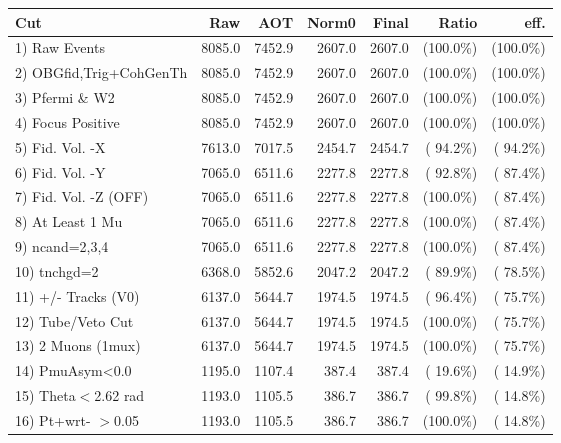  \begin{table}[h!]\centering
 \begin{tabular}{||l||r|r|r|r|r|r||}
 \hline
 \hline
 Cut & Raw & AOT & Norm0 & Final & Ratio & eff.       \\
 \hline
  1) Raw Events           &       8085.0 &       7452.9 &       2607.0 &       2607.0 & (100.0\%) & (100.0\%) \\
  2) OBGfid,Trig+CohGenTh &       8085.0 &       7452.9 &       2607.0 &       2607.0 & (100.0\%) & (100.0\%) \\
  3) Pfermi \& W2         &       8085.0 &       7452.9 &       2607.0 &       2607.0 & (100.0\%) & (100.0\%) \\
  4) Focus Positive       &       8085.0 &       7452.9 &       2607.0 &       2607.0 & (100.0\%) & (100.0\%) \\
  5) Fid. Vol. -X         &       7613.0 &       7017.5 &       2454.7 &       2454.7 & ( 94.2\%) & ( 94.2\%) \\
  6) Fid. Vol. -Y         &       7065.0 &       6511.6 &       2277.8 &       2277.8 & ( 92.8\%) & ( 87.4\%) \\
  7) Fid. Vol. -Z (OFF)   &       7065.0 &       6511.6 &       2277.8 &       2277.8 & (100.0\%) & ( 87.4\%) \\
  8) At Least 1 Mu        &       7065.0 &       6511.6 &       2277.8 &       2277.8 & (100.0\%) & ( 87.4\%) \\
  9) ncand=2,3,4          &       7065.0 &       6511.6 &       2277.8 &       2277.8 & (100.0\%) & ( 87.4\%) \\
 10) tnchgd=2             &       6368.0 &       5852.6 &       2047.2 &       2047.2 & ( 89.9\%) & ( 78.5\%) \\
 11) +/- Tracks (V0)      &       6137.0 &       5644.7 &       1974.5 &       1974.5 & ( 96.4\%) & ( 75.7\%) \\
 12) Tube/Veto Cut        &       6137.0 &       5644.7 &       1974.5 &       1974.5 & (100.0\%) & ( 75.7\%) \\
 13) 2 Muons (1mux)       &       6137.0 &       5644.7 &       1974.5 &       1974.5 & (100.0\%) & ( 75.7\%) \\
 14) PmuAsym<0.0          &       1195.0 &       1107.4 &        387.4 &        387.4 & ( 19.6\%) & ( 14.9\%) \\
 15) Theta$<$2.62 rad     &       1193.0 &       1105.5 &        386.7 &        386.7 & ( 99.8\%) & ( 14.8\%) \\
 16) Pt+wrt- $>$0.05      &       1193.0 &       1105.5 &        386.7 &        386.7 & (100.0\%) & ( 14.8\%) \\

\end{tabular}
\end{table}
